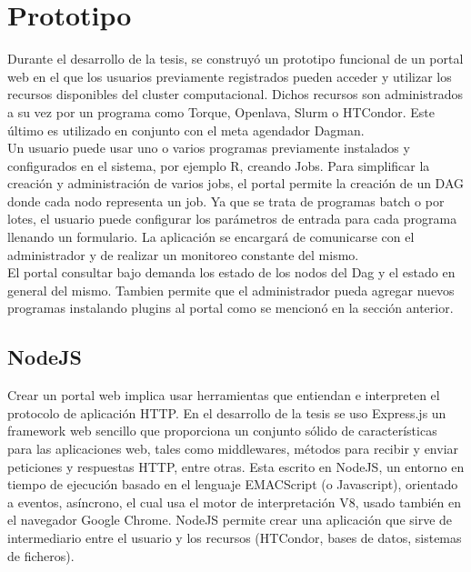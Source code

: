 \section{Prototipo}

Durante el desarrollo de la tesis, se construyó un prototipo funcional de un  portal web en el que los usuarios previamente registrados pueden acceder y utilizar los recursos disponibles del cluster computacional. Dichos recursos son administrados a su vez por un programa como Torque, Openlava, Slurm o HTCondor. Este último es utilizado en conjunto con el meta agendador Dagman.\\

Un usuario puede usar uno o varios programas previamente instalados y configurados en el sistema, por ejemplo R, creando Jobs. Para simplificar la creación y administración de varios jobs, el portal permite la creación de un DAG donde cada nodo representa un job. Ya que se trata de programas batch o por lotes, el usuario puede configurar los parámetros de entrada para cada programa llenando un formulario. La aplicación se encargará de comunicarse con el administrador y de realizar un monitoreo constante del mismo.\\

El portal consultar bajo demanda los estado de los nodos del Dag y el estado en general del mismo. Tambien permite que el administrador pueda agregar nuevos programas instalando plugins al portal como se mencionó en la sección anterior.\\

\subsection{NodeJS}
Crear un portal web implica usar herramientas que entiendan e interpreten el protocolo de aplicación HTTP. En el desarrollo de la tesis se uso Express.js un framework web sencillo que proporciona un conjunto sólido de características para las aplicaciones web, tales como middlewares, métodos para recibir y enviar peticiones y respuestas HTTP, entre otras. Esta escrito en NodeJS, un entorno en tiempo de ejecución basado en el lenguaje EMACScript (o Javascript), orientado a eventos, asíncrono, el cual usa el motor de interpretación V8, usado también en el navegador Google Chrome. NodeJS permite crear una aplicación que sirve de intermediario entre el usuario y los recursos (HTCondor, bases de datos, sistemas de ficheros).\\

